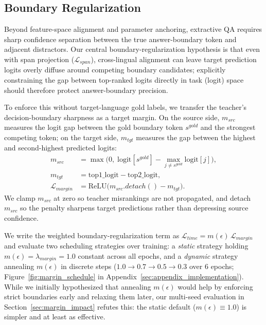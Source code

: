 \documentclass[11pt]{article}
\begin{document}
\subsection{Boundary Regularization}
\label{sec:temporal}
Beyond feature-space alignment and parameter anchoring, extractive QA requires sharp confidence separation between the true answer-boundary token and adjacent distractors. Our central boundary-regularization hypothesis is that even with span projection ($\mathcal{L}_{span}$), cross-lingual alignment can leave target prediction logits overly diffuse around competing boundary candidates; explicitly constraining the gap between top-ranked logits directly in task (logit) space should therefore protect answer-boundary precision.

To enforce this without target-language gold labels, we transfer the teacher's decision-boundary sharpness as a target margin. On the source side, $m_{src}$ measures the logit gap between the gold boundary token $s^{gold}$ and the strongest competing token; on the target side, $m_{tgt}$ measures the gap between the highest and second-highest predicted logits:
\begin{align*}
m_{src} &= \max\Big(0,\; \text{logit}[s^{gold}] - \max_{j \neq s^{gold}} \text{logit}[j]\Big), \\
m_{tgt} &= \text{top1\_logit} - \text{top2\_logit}, \\
\mathcal{L}_{margin} &= \text{ReLU}\big(m_{src}.detach() - m_{tgt}\big).
\end{align*}
We clamp $m_{src}$ at zero so teacher misrankings are not propagated, and detach $m_{src}$ so the penalty sharpens target predictions rather than depressing source confidence.

We write the weighted boundary-regularization term as $\mathcal{L}_{time} = m(\epsilon)\,\mathcal{L}_{margin}$ and evaluate two scheduling strategies over training: a \emph{static} strategy holding $m(\epsilon) = \lambda_{margin} = 1.0$ constant across all epochs, and a \emph{dynamic} strategy annealing $m(\epsilon)$ in discrete steps ($1.0 \rightarrow 0.7 \rightarrow 0.5 \rightarrow 0.3$ over 6 epochs; Figure~\ref{fig:margin_schedule} in Appendix~\ref{sec:appendix_implementation}). While we initially hypothesized that annealing $m(\epsilon)$ would help by enforcing strict boundaries early and relaxing them later, our multi-seed evaluation in Section~\ref{sec:margin_impact} refutes this: the static default ($m(\epsilon) \equiv 1.0$) is simpler and at least as effective.
\end{document}
